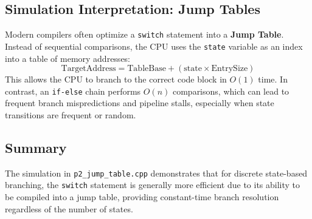 \subsection*{Simulation Interpretation: Jump Tables}

Modern compilers often optimize a \texttt{switch} statement into a \textbf{Jump Table}. Instead of sequential comparisons, the CPU uses the \texttt{state} variable as an index into a table of memory addresses:
\[
\text{TargetAddress} = \text{TableBase} + (\text{state} \times \text{EntrySize})
\]
This allows the CPU to branch to the correct code block in $O(1)$ time. In contrast, an \texttt{if-else} chain performs $O(n)$ comparisons, which can lead to frequent branch mispredictions and pipeline stalls, especially when state transitions are frequent or random.

\subsection*{Summary}

The simulation in \texttt{p2\_jump\_table.cpp} demonstrates that for discrete state-based branching, the \texttt{switch} statement is generally more efficient due to its ability to be compiled into a jump table, providing constant-time branch resolution regardless of the number of states.
